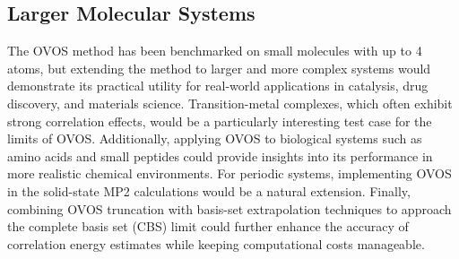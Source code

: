 \subsection{Larger Molecular Systems}

The OVOS method has been benchmarked on small molecules with up to 4 atoms, but extending the method to larger and more complex systems would demonstrate its practical utility for real-world applications in catalysis, drug discovery, and materials science. Transition-metal complexes, which often exhibit strong correlation effects, would be a particularly interesting test case for the limits of OVOS. Additionally, applying OVOS to biological systems such as amino acids and small peptides could provide insights into its performance in more realistic chemical environments. For periodic systems, implementing OVOS in the solid-state MP2 calculations would be a natural extension. Finally, combining OVOS truncation with basis-set extrapolation techniques to approach the complete basis set (CBS) limit could further enhance the accuracy of correlation energy estimates while keeping computational costs manageable.